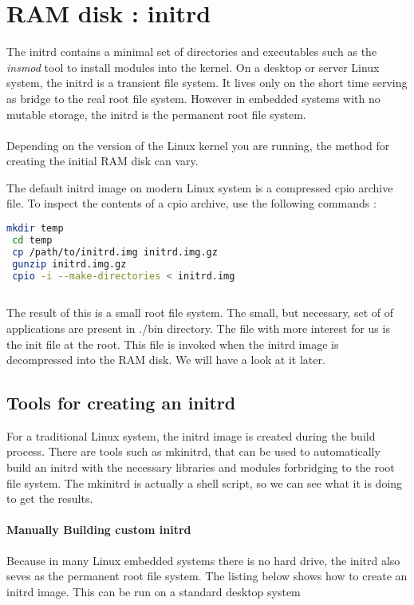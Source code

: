 \documentclass[a4paper,11pt]{report}
\begin{document}
\section{RAM disk : initrd}

The initrd contains a minimal set of directories and executables such as the \textit{insmod} tool to install modules into the kernel.
On a desktop or server Linux system, the initrd is a transient file system. It lives only on the short time serving as bridge to the real root file system.
However in embedded systems with no mutable storage, the initrd is the permanent
root file system. 

\paragraph{}
Depending on the version of the Linux kernel you are running, the method for
creating the initial RAM disk can vary.

The default initrd image on modern Linux system is a compressed cpio archive file.
To inspect the contents of a cpio archive, use the following commands :
\begin{lstlisting}[language=bash, caption={Inspecting the cpio archive content}]
 mkdir temp
 cd temp
 cp /path/to/initrd.img initrd.img.gz
 gunzip initrd.img.gz
 cpio -i --make-directories < initrd.img
 
\end{lstlisting}
 The result of this is a small root file system.
 The small, but necessary, set of of applications are present in ./bin directory.
 The file with more interest for us is the init file at the root. This file is invoked when the initrd image is decompressed into the RAM disk. We will have a look at it later.
 
\subsection{Tools for creating an initrd}
For a traditional Linux system, the initrd image is created during the build process. There are tools such as mkinitrd, that can be used to automatically build an initrd with the necessary libraries and modules forbridging to the 
root file system. The mkinitrd is actually a shell script, so we can see what it 
is doing to get the results.

\paragraph{Manually Building custom initrd}
Because in many Linux embedded systems there is no hard drive, the initrd also seves as the permanent root file system. The listing below shows how to create
an initrd image. This can be run on a standard desktop system
\end{document}

